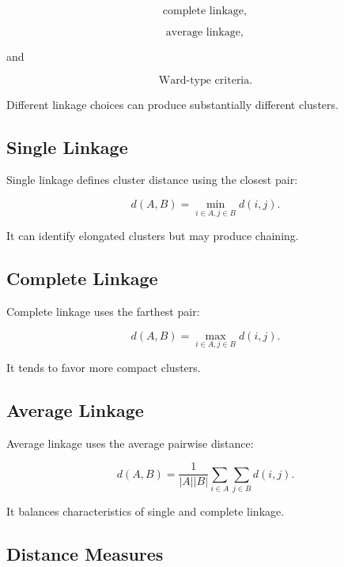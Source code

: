 \[
\boxed{
\text{complete linkage},
}
\]

\[
\boxed{
\text{average linkage},
}
\]

and

\[
\boxed{
\text{Ward-type criteria}.
}
\]

Different linkage choices can produce substantially different clusters.

\subsection{Single Linkage}
\label{subsec:single-linkage}

Single linkage defines cluster distance using the closest pair:

\[
\boxed{
d(A,B)
=
\min_{
i\in A,
j\in B
}
d(i,j).
}
\]

It can identify elongated clusters but may produce chaining.

\subsection{Complete Linkage}
\label{subsec:complete-linkage}

Complete linkage uses the farthest pair:

\[
\boxed{
d(A,B)
=
\max_{
i\in A,
j\in B
}
d(i,j).
}
\]

It tends to favor more compact clusters.

\subsection{Average Linkage}
\label{subsec:average-linkage}

Average linkage uses the average pairwise distance:

\[
\boxed{
d(A,B)
=
\frac1{
|A||B|
}
\sum_{i\in A}
\sum_{j\in B}
d(i,j).
}
\]

It balances characteristics of single and complete linkage.

\subsection{Distance Measures}
\label{subsec:distance-measures-learning}

